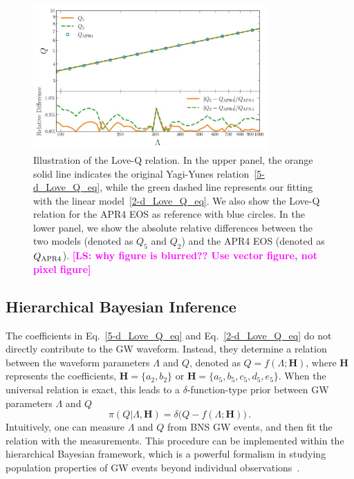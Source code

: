 \documentclass[a4paper,11pt]{article}
\newcommand{\LS}[1]{\textcolor{magenta}{\bf #1}}
\begin{document}
\begin{figure}[tbp]
\centering
\includegraphics[width=0.8\textwidth]{fig_2d-5d_difference.pdf}
\caption{Illustration of the Love-Q relation. In the upper panel, the orange
solid line indicates the original Yagi-Yunes relation~\eqref{5-d_Love_Q_eq},
while the green dashed line represents our fitting with the linear
model~\eqref{2-d_Love_Q_eq}. We also show the Love-Q relation for the APR4 EOS
as reference with blue circles.  In the lower panel, we show the absolute
relative differences between the two models (denoted as $Q_5$ and $Q_2$) and the
APR4 EOS (denoted as $Q_{\rm APR4}$). 
\LS{[LS: why figure is blurred?? Use vector figure, not pixel figure]}}
\label{relative_difference}
\end{figure}

\subsection{Hierarchical Bayesian Inference}
\label{subsec:framework_principles}

The coefficients in Eq.~\eqref{5-d_Love_Q_eq} and Eq.~\eqref{2-d_Love_Q_eq} do
not directly contribute to the GW waveform. Instead, they determine a relation
between the waveform parameters $\Lambda$ and $Q$, denoted as
$Q=f(\Lambda;\bm{H})$, where $\bm{H}$ represents the coefficients, $\bm{H} =
\{a_2, b_2\}$ or $\bm{H} = \{a_5, b_5, c_5, d_5, e_5\}$. When the universal
relation is exact, this leads to a $\delta$-function-type prior between GW
parameters $\Lambda$ and $Q$
\begin{equation}
\label{delta function prior}
\pi(Q|\Lambda,\bm{H}) = \delta\big(Q-f(\Lambda;\bm{H})\big)\,.
\end{equation}
Intuitively, one can measure $\Lambda$ and $Q$ from BNS GW events, and then fit
the relation with the measurements. This procedure can be implemented within the
hierarchical Bayesian framework, which is a powerful formalism in studying population
properties of GW events beyond individual observations~\cite{Thrane_2019}. 
\end{document}
